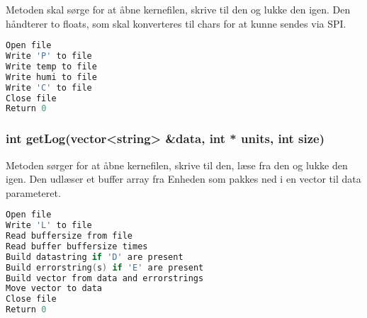 Metoden skal sørge for at åbne kernefilen, skrive til den og lukke den igen.
Den håndterer to floats, som skal konverteres til chars for at kunne sendes via SPI.

\begin{lstlisting}[language=C]
Open file
Write 'P' to file
Write temp to file
Write humi to file
Write 'C' to file
Close file
Return 0
\end{lstlisting} 
\subsubsection*{int getLog(vector<string> \&data, int * units, int size)}

Metoden sørger for at åbne kernefilen, skrive til den, læse fra den og lukke den igen.
Den udlæser et buffer array fra Enheden som pakkes ned i en vector til data parameteret.

\begin{lstlisting}[language=C]
Open file
Write 'L' to file
Read buffersize from file
Read buffer buffersize times
Build datastring if 'D' are present
Build errorstring(s) if 'E' are present
Build vector from data and errorstrings
Move vector to data
Close file
Return 0
\end{lstlisting} 